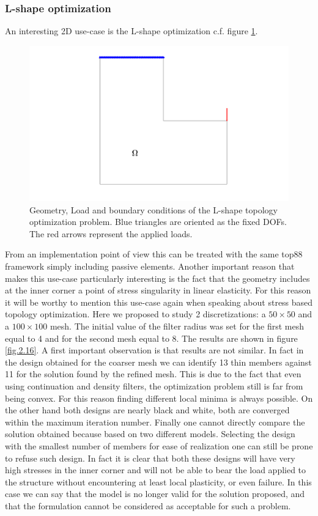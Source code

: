 \subsubsection{L-shape optimization}
An interesting 2D use-case is the L-shape optimization c.f. figure \ref{fig.2.15}. 
\begin{figure}[ht]
\centering
\includegraphics[width=\textwidth]{images/Ch2/design_problem3}
\caption{Geometry, Load and boundary conditions of the L-shape topology optimization problem. Blue triangles are oriented as the fixed DOFs. The red arrows represent the applied loads.}
\label{fig.2.15}
\end{figure}
From an implementation point of view this can be treated with the same top88 framework simply including passive elements. Another important reason that makes this use-case particularly interesting is the fact that the geometry includes at the inner corner a point of stress singularity  in linear elasticity. For this reason it will be worthy to mention this use-case again when speaking about stress based topology optimization. Here we proposed to study 2 discretizations: a $50\times50$ and a $100\times100$ mesh.
The initial value of the filter radius was set for the first mesh equal to 4 and for the second mesh equal to 8. The results are shown in figure \ref{fig.2.16}. A first important observation is that results are not similar. In fact in the design obtained for the coarser mesh we can identify 13 thin members against 11 for the solution found by the refined mesh. This is due to the fact that even using continuation and density filters, the optimization problem still is far from being convex. For this reason finding different local minima is always possible. On the other hand both designs are nearly black and white, both are converged within the maximum iteration number. Finally one cannot directly compare the solution obtained because based on two different models. Selecting the design with the smallest number of members for ease of realization one can still be prone to refuse such design. In fact it is clear that both these designs will have very high stresses in the inner corner and will not be able to bear the load applied to the structure without encountering at least local plasticity, or even failure. In this case we can say that the model is no longer valid for the solution proposed, and that the formulation cannot be considered as acceptable for such a problem. 
